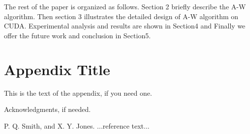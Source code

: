 \documentclass{sigplanconf}
\begin{document}
The rest of the paper is organized as follows. Section 2 briefly describe the A-W algorithm. Then section 3 illustrates the detailed design of A-W algorithm on CUDA. Experimental analysis and results are shown in Section4 and Finally we offer the future work and conclusion in Section5.



\appendix
\section{Appendix Title}

This is the text of the appendix, if you need one.

\acks

Acknowledgments, if needed.





\begin{thebibliography}{}
\softraggedright

P. Q. Smith, and X. Y. Jones. ...reference text...

\end{thebibliography}
\end{document}
